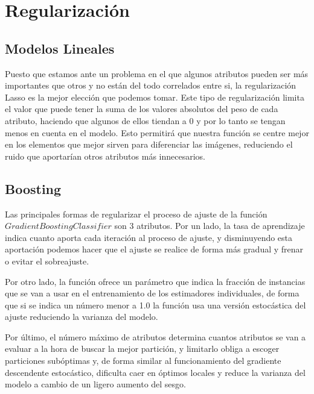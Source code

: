 \documentclass{article}
\begin{document}
	\section{Regularización}
	
	\subsection{Modelos Lineales}
	Puesto que estamos ante un problema en el que algunos atributos pueden ser más importantes que otros y no están del todo correlados entre si, la regularización Lasso es la mejor elección que podemos tomar. Este tipo de regularización limita el valor que puede tener la suma de los valores absolutos del peso de cada atributo, haciendo que algunos de ellos tiendan a 0 y por lo tanto se tengan menos en cuenta en el modelo. Esto permitirá que nuestra función se centre mejor en los elementos que mejor sirven para diferenciar las imágenes, reduciendo el ruido que aportarían otros atributos más innecesarios.
	\subsection{Boosting}
	Las principales formas de regularizar el proceso de ajuste de la función $GradientBoostingClassifier$ son 3 atributos. Por un lado, la tasa de aprendizaje indica cuanto aporta cada iteración al proceso de ajuste, y disminuyendo esta aportación podemos hacer que el ajuste se realice de forma más gradual y frenar o evitar el sobreajuste. 
	\par 
	Por otro lado, la función ofrece un parámetro que indica la fracción de instancias que se van a usar en el entrenamiento de los estimadores individuales, de forma que si se indica un número menor a 1.0 la función usa una versión estocástica del ajuste reduciendo la varianza del modelo.
	\par 
	Por último, el número máximo de atributos determina cuantos atributos se van a evaluar a la hora de buscar la mejor partición, y limitarlo obliga a escoger particiones subóptimas y, de forma similar al funcionamiento del gradiente descendente estocástico, dificulta caer en óptimos locales y reduce la varianza del modelo a cambio de un ligero aumento del sesgo.
\end{document}
